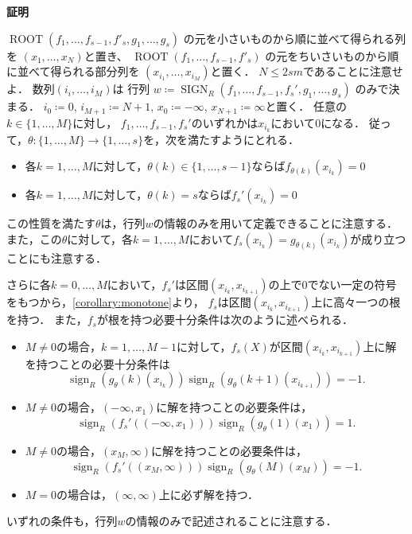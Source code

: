 \documentclass[uplatex, dvipdfmx]{jsarticle}
\makeatletter
\numberwithin{equation}{section}
\renewenvironment{proof}[1][\proofname]{\par
  \pushQED{\qed}%
  \normalfont \topsep6\p@\@plus6\p@\relax
  \trivlist
  \item\relax
  {\bfseries
  #1\@addpunct{.}}\hspace\labelsep\ignorespaces
}{
  \popQED\endtrivlist\@endpefalse
}
\newcommand{\map}[3]{{#1}\colon{#2}\rightarrow{#3}}
\DeclareMathOperator{\sign}{sign}
\DeclareMathOperator{\SIGN}{SIGN}
\DeclareMathOperator{\ROOT}{ROOT}
\theoremstyle{definition}
\renewcommand{\proofname}{\textbf{証明}}
\makeatother
\begin{document}
\begin{proof}
     $\ROOT(f_1, \dots, f_{s-1}, f'_s, g_1, \dots, g_s)$
     の元を小さいものから順に並べて得られる列を
     $(x_1, \dots, x_N)$と置き、
     $\ROOT(f_1,\ldots, f_{s-1}, f'_s)$
     の元をちいさいものから順に並べて得られる部分列を
     $(x_{i_1}, \dots, x_{i_M})$と置く．
     $N \leq 2sm$であることに注意せよ．
     数列$(i_i, \dots, i_M)$は
     行列
     $
     w \coloneqq
     \SIGN_R(f_1, \dots, f_{s-1}, f_s', g_1, \dots, g_s)
     $
     のみで決まる．
     $i_0\coloneqq 0$, $i_{M+1}\coloneqq N+1$, $x_0\coloneqq -\infty$, $x_{N+1}\coloneqq \infty$と置く．
     任意の$k \in \{1, \dots, M \}$に対し，
     $f_1, \dots, f_{s-1}, f_s'$のいずれかは$x_{i_k}$において$0$になる．
     従って，$\map{\theta}{\{1,\dots, M\}}{\{1, \dots, s\}}$を，次を満たすようにとれる．
     \begin{itemize}
          \item 各$k=1, \dots, M$に対して，$\theta(k) \in \{1, \dots, s-1\}$ならば$f_{\theta(k)}(x_{i_k})=0$
          \item 各$k=1, \dots, M$に対して，$\theta(k)=s$ならば$f_s'(x_{i_k}) = 0$
     \end{itemize}
     この性質を満たす$\theta$は，行列$w$の情報のみを用いて定義できることに注意する．
     また，この$\theta$に対して，各$k=1, \dots, M$において$f_s(x_{i_k}) = g_{\theta(k)}(x_{i_k})$が成り立つことにも注意する．

     さらに各$k=0, \dots, M$において，$f_s'$は区間$(x_{i_k}, x_{i_{k+1}})$の上で$0$でない一定の符号をもつから，\cref{corollary:monotone}より，
     $f_s$は区間$(x_{i_k}, x_{i_{k+1}})$上に高々一つの根を持つ．
     また，$f_s$が根を持つ必要十分条件は次のように述べられる．
     \begin{itemize}
          \item $M\neq0$の場合，$k=1, \dots, M-1$に対して，$f_s(X)$が区間$(x_{i_k}, x_{i_{k+1}})$上に解を持つことの必要十分条件は
          \begin{equation}
               \sign_R(g_\theta(k)(x_{i_k}))\sign_R(g_\theta(k+1)(x_{i_{k+1}})) = -1.
          \end{equation}
          \item $M\neq0$の場合，$(-\infty, x_1)$に解を持つことの必要条件は，
          \begin{equation}
               \sign_R(f_s'((-\infty, x_1))) \sign_R(g_\theta(1)(x_1)) = 1.
          \end{equation}
          \item $M\neq0$の場合，$(x_M, \infty)$に解を持つことの必要条件は，
          \begin{equation}
               \sign_R(f_s'((x_M, \infty))) \sign_R(g_\theta(M)(x_M)) = -1.
          \end{equation}
          \item $M = 0$の場合は，$(\infty, \infty)$上に必ず解を持つ．
     \end{itemize}
     いずれの条件も，行列$w$の情報のみで記述されることに注意する．


\end{proof}
\end{document}
